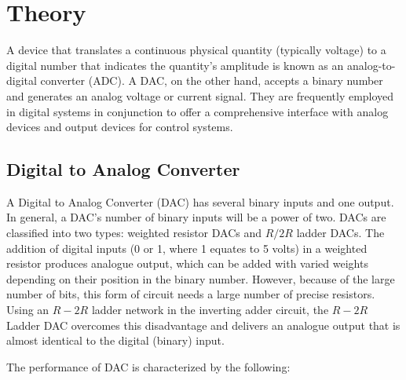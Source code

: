 \section{Theory}
A device that translates a continuous physical quantity (typically voltage) to a digital number that indicates
the quantity’s amplitude is known as an analog-to-digital
converter (ADC). A DAC, on the other hand, accepts a
binary number and generates an analog voltage or current
signal. They are frequently employed in digital systems in
conjunction to offer a comprehensive interface with analog devices and output devices for control systems.

\subsection{Digital to Analog Converter}
A Digital to Analog Converter (DAC) has several binary inputs and one output. In general, a DAC’s number
of binary inputs will be a power of two. DACs are classified into two types: weighted resistor DACs and $R/2R$
ladder DACs. The addition of digital inputs (0 or 1,
where 1 equates to 5 volts) in a weighted resistor produces analogue output, which can be added with varied
weights depending on their position in the binary number. However, because of the large number of bits, this
form of circuit needs a large number of precise resistors.
Using an $R-2R$ ladder network in the inverting adder circuit, the $R-2R$ Ladder DAC overcomes this disadvantage
and delivers an analogue output that is almost identical
to the digital (binary) input. 

The performance of DAC is
characterized by the following:\\

